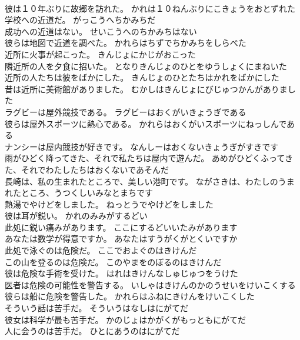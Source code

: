 \documentclass[8pt]{extreport}
\begin{document}
\begin{CJK}{UTF8}{min}
\\	彼は１０年ぶりに故郷を訪れた。	かれは１０ねんぶりにこきょうをおとずれた 
\\	学校への近道だ。	がっこうへちかみちだ 
\\	成功への近道はない。	せいこうへのちかみちはない 
\\	彼らは地図で近道を調べた。	かれらはちずでちかみちをしらべた 
\\	近所に火事が起こった。	きんじょにかじがおこった 
\\	隣近所の人を夕食に招いた。	となりきんじょのひとをゆうしょくにまねいた 
\\	近所の人たちは彼をばかにした。	きんじょのひとたちはかれをばかにした 
\\	昔は近所に美術館がありました。	むかしはきんじょにびじゅつかんがありました 
\\	ラグビーは屋外競技である。	ラグビーはおくがいきょうぎである 
\\	彼らは屋外スポーツに熱心である。	かれらはおくがいスポーツにねっしんである 
\\	ナンシーは屋内競技が好きです。	なんしーはおくないきょうぎがすきです 
\\	雨がひどく降ってきた、それで私たちは屋内で遊んだ。	あめがひどくふってきた、それでわたしたちはおくないであそんだ 
\\	長崎は、私の生まれたところで、美しい港町です。	ながさきは、わたしのうまれたところ、うつくしいみなとまちです 
\\	熱湯でやけどをしました。	ねっとうでやけどをしました 
\\	彼は耳が鋭い。	かれのみみがするどい 
\\	此処に鋭い痛みがあります。	ここにするどいいたみがあります 
\\	あなたは数学が得意ですか。	あなたはすうがくがとくいですか 
\\	此処で泳ぐのは危険だ。	ここでおよぐのはきけんだ 
\\	この山を登るのは危険だ。	このやまをのぼるのはきけんだ 
\\	彼は危険な手術を受けた。	はれはきけんなしゅじゅつをうけた 
\\	医者は危険の可能性を警告する。	いしゃはきけんのかのうせいをけいこくする 
\\	彼らは船に危険を警告した。	かれらはふねにきけんをけいこくした 
\\	そういう話は苦手だ。	そういうはなしはにがてだ 
\\	彼女は科学が最も苦手だ。	かのじょはかがくがもっともにがてだ 
\\	人に会うのは苦手だ。	ひとにあうのはにがてだ 

\end{CJK}
\end{document}
